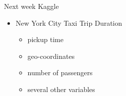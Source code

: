 \documentclass[
 size=14pt,
 paper=smartboard,  %
 mode=present, 		%
 display=slides, 	%
 style=tuliplab,  	%
 pauseslide,
 fleqn,leqno]{powerdot}
\begin{document}


\begin{slide}{Next week}
Kaggle
\begin{itemize}
\item
New York City Taxi Trip Duration

\begin{itemize}
\item
pickup time
\item
geo-coordinates
\item
number of passengers
\item
several other variables
\end{itemize}
\end{itemize}




\end{slide}




\end{document}
